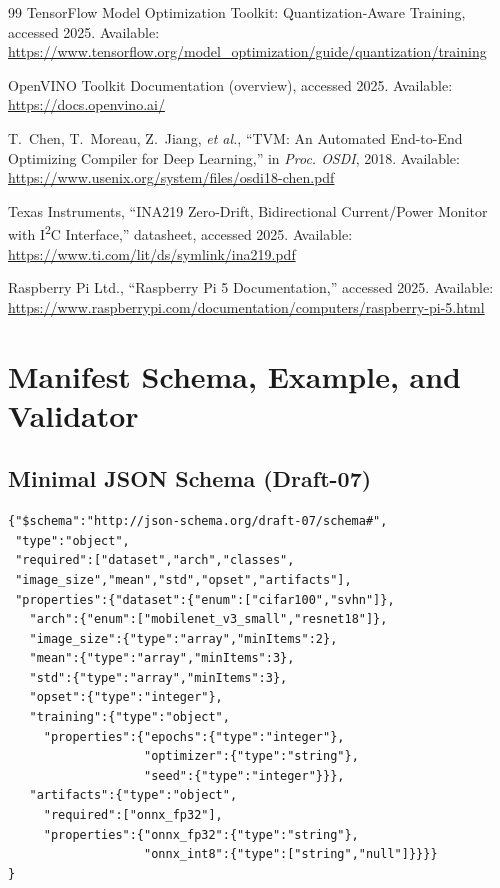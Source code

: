 \documentclass{article}
\begin{document}
\begin{thebibliography}{99}
TensorFlow Model Optimization Toolkit: Quantization-Aware Training, accessed 2025. Available: \url{https://www.tensorflow.org/model_optimization/guide/quantization/training}

OpenVINO Toolkit Documentation (overview), accessed 2025. Available: \url{https://docs.openvino.ai/}

T.~Chen, T.~Moreau, Z.~Jiang, \emph{et al.}, “TVM: An Automated End-to-End Optimizing Compiler for Deep Learning,” in \emph{Proc. OSDI}, 2018. Available: \url{https://www.usenix.org/system/files/osdi18-chen.pdf}

Texas Instruments, “INA219 Zero-Drift, Bidirectional Current/Power Monitor with I\textsuperscript{2}C Interface,” datasheet, accessed 2025. Available: \url{https://www.ti.com/lit/ds/symlink/ina219.pdf}

Raspberry Pi Ltd., “Raspberry Pi 5 Documentation,” accessed 2025. Available: \url{https://www.raspberrypi.com/documentation/computers/raspberry-pi-5.html}

\end{thebibliography}

\appendix
\section{Manifest Schema, Example, and Validator}
\label{app:manifest}

\subsection{Minimal JSON Schema (Draft-07)}
\begin{verbatim}
{"$schema":"http://json-schema.org/draft-07/schema#",
 "type":"object",
 "required":["dataset","arch","classes",
 "image_size","mean","std","opset","artifacts"],
 "properties":{"dataset":{"enum":["cifar100","svhn"]},
   "arch":{"enum":["mobilenet_v3_small","resnet18"]},
   "image_size":{"type":"array","minItems":2},
   "mean":{"type":"array","minItems":3},
   "std":{"type":"array","minItems":3},
   "opset":{"type":"integer"},
   "training":{"type":"object",
     "properties":{"epochs":{"type":"integer"},
                   "optimizer":{"type":"string"},
                   "seed":{"type":"integer"}}},
   "artifacts":{"type":"object",
     "required":["onnx_fp32"],
     "properties":{"onnx_fp32":{"type":"string"},
                   "onnx_int8":{"type":["string","null"]}}}}
}
\end{verbatim}
\end{document}
